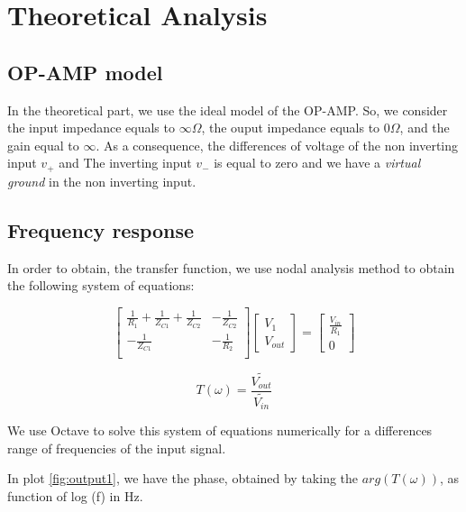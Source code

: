 \section{Theoretical Analysis}
\label{sec:analysis}

\subsection{OP-AMP model}

In the theoretical part, we use the ideal model of the OP-AMP. So, we consider the input impedance equals to $\infty \Omega$, the ouput impedance
equals to $0 \Omega$, and the gain equal to $\infty$. As a consequence, the differences of voltage of the non inverting input $v_{+}$ and The
inverting input $v_{-}$ is equal to zero and we have a \textit{virtual ground} in the non inverting input.


\subsection{Frequency response}

In order to obtain, the transfer function, we use nodal analysis method to obtain the following system of equations:

\[
  \begin{bmatrix}
    \frac{1}{R_1} + \frac{1}{Z_{C1}} + \frac{1}{Z_{C2}} & -\frac{1}{Z_{C2}} \\
    -\frac{1}{Z_{C1}}                                   & -\frac{1}{R_2}    \\
  \end{bmatrix}
  \begin{bmatrix}
    V_{1} \\ V_{out}
  \end{bmatrix}
  =
  \begin{bmatrix}
    \frac{V_{in}}{R_1} \\ 0
  \end{bmatrix}
\]

\hfill



\begin{equation}
  T(\omega) = \frac{\widetilde{V_{out}}}{\widetilde{V_{in}}}
  \label{frequencyR}
\end{equation}

We use Octave to solve this system of equations numerically for a differences range of frequencies of the input signal.

In plot \ref{fig:output1}, we have the phase, obtained by taking the $arg(T(\omega))$, as function of log (f) in Hz.

